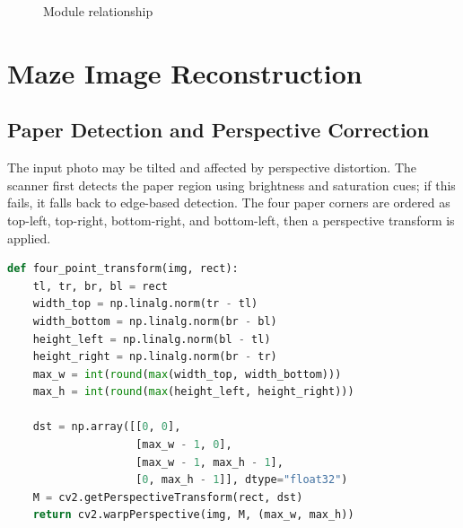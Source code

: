 \documentclass[a4paper,12pt]{article}
\begin{document}
\begin{figure}[H]
  \centering
  \caption{Module relationship}
  \label{fig:module_relation}
\end{figure}

\section{Maze Image Reconstruction}

\subsection{Paper Detection and Perspective Correction}

The input photo may be tilted and affected by perspective distortion. The scanner first detects the paper region using brightness and saturation cues; if this fails, it falls back to edge-based detection. The four paper corners are ordered as top-left, top-right, bottom-right, and bottom-left, then a perspective transform is applied.

\begin{lstlisting}[language=Python, caption={Four-point perspective transformation}]
def four_point_transform(img, rect):
    tl, tr, br, bl = rect
    width_top = np.linalg.norm(tr - tl)
    width_bottom = np.linalg.norm(br - bl)
    height_left = np.linalg.norm(bl - tl)
    height_right = np.linalg.norm(br - tr)
    max_w = int(round(max(width_top, width_bottom)))
    max_h = int(round(max(height_left, height_right)))

    dst = np.array([[0, 0],
                    [max_w - 1, 0],
                    [max_w - 1, max_h - 1],
                    [0, max_h - 1]], dtype="float32")
    M = cv2.getPerspectiveTransform(rect, dst)
    return cv2.warpPerspective(img, M, (max_w, max_h))
\end{lstlisting}
\end{document}
